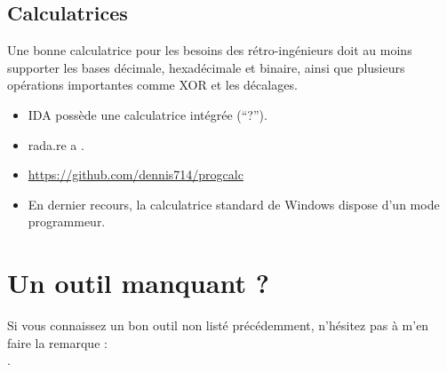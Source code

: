 \subsection{Calculatrices}

Une bonne calculatrice pour les besoins des rétro-ingénieurs doit au moins supporter
les bases décimale, hexadécimale et binaire, ainsi que plusieurs opérations importantes
comme XOR et les décalages.

\begin{itemize}

\item IDA possède une calculatrice intégrée (``?'').

\item rada.re a .

\item \url{https://github.com/dennis714/progcalc}

\item En dernier recours, la calculatrice standard de Windows dispose d'un mode
programmeur.

\end{itemize}

\section{Un outil manquant ?}

Si vous connaissez un bon outil non listé précédemment, n'hésitez pas à m'en faire la remarque : \\
\TT{\EMAIL}.

